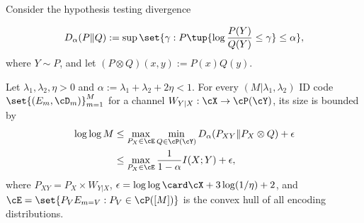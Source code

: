 \documentclass[conference,final]{IEEEtran}
\begin{document}
Consider the hypothesis testing divergence

\begin{gather}
  D_\alpha(P \| Q)
  := \sup\set{ \gamma : P\tup{ \log \frac{P(Y)}{Q(Y)} \le \gamma } \le \alpha },
\end{gather}
where $Y \sim P$,
and let $(P \otimes Q) (x, y) := P(x) Q(y)$.


\begin{lemma}
  \label{lemma:idConverse.oneShot}
  Let $\lambda_1, \lambda_2, \eta > 0$ and $\alpha := \lambda_1 + \lambda_2 + 2\eta < 1$.
  For every $(M | \lambda_1, \lambda_2)$ ID code $\set{(E_m, \cD_m)}_{m=1}^M$
  for a channel $W_{Y|X} : \cX \to \cP(\cY)$,
  its size is bounded by
  \begin{align}
    \log\log M
    &
    \label{eq:idConverse.oneShot.divergence.PX}
    \le \max_{P_X \in \cE} \min_{Q \in \cP(\cY)}
      D_\alpha (P_{XY} \| P_X \otimes Q)
      + \epsilon
    \\&
    \label{eq:idConverse.oneShot.mutinf}
    \le \max_{P_X \in \cE}
      \frac{1}{1-\alpha}
      I(X; Y)
      + \epsilon,
  \end{align}
  where $P_{XY} = P_X \times W_{Y|X}$, $\epsilon = \log\log \card\cX + 3 \log(1/\eta) + 2$,
  and $\cE = \set{ P_V E_{m=V} : P_V \in \cP([M])}$
  is the convex hull of all encoding distributions.
\end{lemma}
\end{document}
